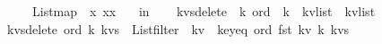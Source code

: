 \begin{isabellebody}
\ \ \ \ {\isacharparenleft}List{\isachardot}map\ {\isacharparenleft}{\isacharpercent}\ x{\isachardot}\ {\isacharparenleft}x{\isacharcomma}x{\isacharparenright}{\isacharparenright}\ {\isacharbrackleft}{}{\isacharcomma}{}{\isacharcomma}{}{\isacharcomma}{}{\isacharcomma}{}{\isacharbrackright}{\isacharparenright}{\isacharparenright}\isanewline
\ \ in\isanewline
\ \ {\isacharparenleft}{\isacharparenright}{\isacharparenright}{\isachardoublequoteclose}\isanewline
\isanewline
\isanewline
\isanewline
{}\isamarkupfalse%
\ kvs{\isacharunderscore}delete\ {\isacharcolon}{\isacharcolon}\ {\isachardoublequoteopen}{\isacharprime}k\ ord\ {\isasymRightarrow}\ {\isacharprime}k\ {\isasymRightarrow}\ {\isacharparenleft}{\isacharprime}k{\isacharasterisk}{\isacharprime}v{\isacharparenright}list\ {\isasymRightarrow}\ {\isacharparenleft}{\isacharprime}k{\isacharasterisk}{\isacharprime}v{\isacharparenright}list{\isachardoublequoteclose}\ \isanewline
{\isachardoublequoteopen}kvs{\isacharunderscore}delete\ ord\ k\ kvs\ {\isacharequal}\ List{\isachardot}filter\ {\isacharparenleft}{\isacharpercent}\ kv{\isachardot}\ {\isachartilde}\ {\isacharparenleft}key{\isacharunderscore}eq\ ord\ {\isacharparenleft}fst\ kv{\isacharparenright}\ k{\isacharparenright}{\isacharparenright}\ kvs{\isachardoublequoteclose}\isanewline
\ \ \isanewline
\isanewline
%
\isadelimtheory
\isanewline
%
\endisadelimtheory
%
\isatagtheory
{}\isamarkupfalse%
%
\endisatagtheory
{\isafoldtheory}%
%
\isadelimtheory
%
\endisadelimtheory
\end{isabellebody}%
